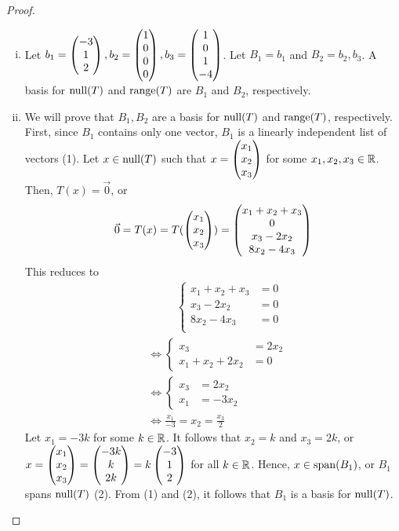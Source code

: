 \begin{proof}
    \renewcommand{\qedsymbol}{$\blacksquare$}
    \begin{enumerate}[(i)]
        \item Let $b_1=\begin{pmatrix} -3\\ 1\\ 2\end{pmatrix},b_2=\begin{pmatrix} 1\\ 0\\0 \\ 0\end{pmatrix},b_3=\begin{pmatrix} 1\\ 0\\1 \\ -4\end{pmatrix}$. Let $B_1=b_1$ and $B_2=b_2,b_3$. A basis for $\textnormal{null}(T)$ and $\textnormal{range}(T)$ are $B_1$ and $B_2$, respectively.
        \item We will prove that $B_1,B_2$ are a basis for $\textnormal{null}(T)$ and $\textnormal{range}(T)$, respectively. 
        First, since $B_1$ contains only one vector, $B_1$ is a linearly independent list of vectors (1).
        Let $x\in\textnormal{null}(T)$ such that $x=\begin{pmatrix} x_1\\ x_2\\ x_3\end{pmatrix}$ for some $x_1,x_2,x_3\in\mathbb R$.
        Then, $T(x)=\vec{0}$, or 
        \[
            \begin{aligned}
                \vec{0} = T(x) = T(\begin{pmatrix} x_1\\ x_2\\ x_3\end{pmatrix}) = \begin{pmatrix} x_1+x_2+x_3\\ 0\\x_3-2x_2 \\ 8x_2-4x_3\end{pmatrix}      
            \end{aligned}
        \]
        This reduces to
        \begin{align*}
            &\qquad \ \ \,
            \begin{cases}
                x_1+x_2+x_3&=0\\
                x_3-2x_2&=0\\
                8x_2-4x_3&=0\\
            \end{cases}\\&\iff
            \begin{cases}
                x_3&=2x_2\\
                x_1+x_2+2x_2&=0
            \end{cases}\\&\iff
            \begin{cases}
                x_3&=2x_2\\
                x_1&=-3x_2
            \end{cases}\\
            &\iff \frac{x_1}{-3}=x_2=\frac{x_3}{2}
        \end{align*}
        Let $x_1=-3k$ for some $k\in\mathbb R$. It follows that $x_2=k$ and $x_3=2k$, or $x=\begin{pmatrix} x_1\\ x_2\\ x_3\end{pmatrix}=\begin{pmatrix} -3k\\ k\\ 2k\end{pmatrix}=k \begin{pmatrix} -3\\ 1\\ 2\end{pmatrix}$ for all $k\in\mathbb R$. Hence, $x\in\textnormal{span}(B_1)$, or $B_1$ spans $\textnormal{null}(T)$ (2).
        From (1) and (2), it follows that $B_1$ is a basis for $\textnormal{null}(T)$.


\end{enumerate}
\end{proof}
